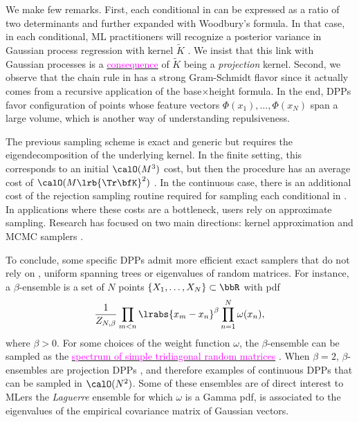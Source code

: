   We make few remarks.
  First, each conditional in  can be expressed as a ratio of two determinants and further expanded with Woodbury's formula.
  In that case, in each conditional, ML practitioners will recognize  a posterior variance in Gaussian process regression with kernel $\tilde K$ \cite[Equation 2.26]{RaWi06}.
  We insist that this link with Gaussian processes is a \href{https://dppy.readthedocs.io/en/latest/finite_dpps/exact_sampling.html#caution}{\textcolor{magenta}{consequence}} of $\tilde K$ being a \emph{projection} kernel.
  Second, we observe that the chain rule in  has a strong Gram-Schmidt flavor since it actually comes from a recursive application of the base$\times$height formula.
  In the end, DPPs favor configuration of points whose feature vectors $\Phi(x_1),\dots, \Phi(x_N)$ span a large volume, which is another way of understanding repulsiveness.

  The previous sampling scheme is exact and generic but requires the eigendecomposition of the underlying kernel.
  In the finite setting, this corresponds to an initial $\calO(M^3)$ cost, but then the procedure has an average cost of $\calO(M\lrb{\Tr \bfK}^2)$
  \citep{TrBaAm18}.
  In the continuous case, there is an additional cost of the rejection sampling routine required for sampling each conditional in .
  In applications where these costs are a bottleneck, users rely on approximate sampling.
  Research has focused on two main directions: kernel approximation \citep{AKFT13} and MCMC samplers \citep{AnGhRe16, LiJeSr16c, GaBaVa17}.

  To conclude, some specific DPPs admit more efficient exact samplers that do not rely on , \eg uniform spanning trees \citep{PrWi98} or eigenvalues of random matrices.
  For instance, a $\beta$-ensemble is a set of $N$ points $\{X_1,\dots,X_N\}\subset \bbR$ with pdf
  \begin{equation*}
  \label{eq:beta_ensemble_pdf}
    \frac{1}{Z_{N,\beta}}
    \prod_{m< n}
      \lrabs{x_m-x_n}^{\beta}
    \prod_{n= 1}^N
      \omega(x_n),
  \end{equation*}
  where $\beta>0$.
  For some choices of the weight function $\omega$, the $\beta$-ensemble can be sampled as the \href{https://dppy.readthedocs.io/en/latest/continuous_dpps/beta_ensembles.banded_models.html}{\textcolor{magenta}{spectrum of simple tridiagonal random matrices}} \citep{DuEd02,KiNe04}.
  When $\beta=2$, $\beta$-ensembles are projection DPPs \citep{Kon05}, and therefore examples of continuous DPPs that can be sampled in $\calO(N^2)$.
  Some of these ensembles are of direct interest to MLers \eg the \emph{Laguerre} ensemble for which $\omega$ is a Gamma pdf, is associated to the eigenvalues of the empirical covariance matrix of \iid Gaussian vectors.

